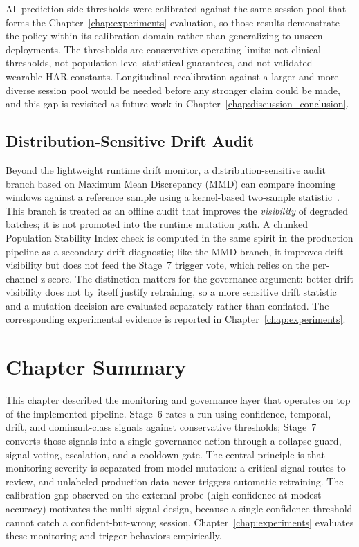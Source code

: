 All prediction-side thresholds were calibrated against the same session pool that forms the
Chapter~\ref{chap:experiments} evaluation, so those results demonstrate the policy within its
calibration domain rather than generalizing to unseen deployments. The thresholds are conservative
operating limits: not clinical thresholds, not population-level statistical guarantees, and not
validated wearable-HAR constants. Longitudinal recalibration against a larger and more diverse
session pool would be needed before any stronger claim could be made, and this gap is revisited as
future work in Chapter~\ref{chap:discussion_conclusion}.

\subsection{Distribution-Sensitive Drift Audit}
\label{sec:mmd_audit}

Beyond the lightweight runtime drift monitor, a distribution-sensitive audit branch based on
Maximum Mean Discrepancy (MMD) can compare incoming windows against a reference sample using a
kernel-based two-sample statistic~\cite{gretton2012kernel}. This branch is treated as an offline audit
that improves the \emph{visibility} of degraded batches; it is not promoted into the runtime mutation
path. A chunked Population Stability Index check is computed in the same spirit in the production
pipeline as a secondary drift diagnostic; like the MMD branch, it improves drift visibility but does
not feed the Stage~7 trigger vote, which relies on the per-channel z-score. The distinction matters for the governance argument: better drift visibility does not by itself
justify retraining, so a more sensitive drift statistic and a mutation decision are evaluated
separately rather than conflated. The corresponding experimental evidence is reported in
Chapter~\ref{chap:experiments}.

\section{Chapter Summary}
\label{sec:chapter6_summary}

This chapter described the monitoring and governance layer that operates on top of the implemented
pipeline. Stage~6 rates a run using confidence, temporal, drift, and dominant-class signals against
conservative thresholds; Stage~7 converts those signals into a single governance action through a
collapse guard, signal voting, escalation, and a cooldown gate. The central principle is that
monitoring severity is separated from model mutation: a critical signal routes to review, and
unlabeled production data never triggers automatic retraining. The calibration gap observed on the
external probe (high confidence at modest accuracy) motivates the multi-signal design, because a
single confidence threshold cannot catch a confident-but-wrong session. Chapter~\ref{chap:experiments}
evaluates these monitoring and trigger behaviors empirically.
